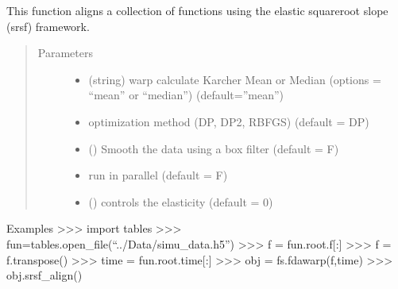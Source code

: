 \documentclass[letterpaper,10pt,english]{sphinxmanual}
\begin{document}
\begin{fulllineitems}
\begin{fulllineitems}
\label{\detokenize{time_warping:time_warping.fdawarp.srsf_align}}
This function aligns a collection of functions using the elastic
square\sphinxhyphen{}root slope (srsf) framework.
\begin{quote}\begin{description}
\item[{Parameters}] \leavevmode\begin{itemize}
\item {} 
 \textendash{} (string) warp calculate Karcher Mean or Median (options = “mean” or “median”) (default=”mean”)

\item {} 
 \textendash{} optimization method (DP, DP2, RBFGS) (default = DP)

\item {} 
 () \textendash{} Smooth the data using a box filter (default = F)

\item {} 
 \textendash{} run in parallel (default = F)

\item {} 
 () \textendash{} controls the elasticity (default = 0)

\end{itemize}

\end{description}\end{quote}

Examples
\textgreater{}\textgreater{}\textgreater{} import tables
\textgreater{}\textgreater{}\textgreater{} fun=tables.open\_file(“../Data/simu\_data.h5”)
\textgreater{}\textgreater{}\textgreater{} f = fun.root.f{[}:{]}
\textgreater{}\textgreater{}\textgreater{} f = f.transpose()
\textgreater{}\textgreater{}\textgreater{} time = fun.root.time{[}:{]}
\textgreater{}\textgreater{}\textgreater{} obj = fs.fdawarp(f,time)
\textgreater{}\textgreater{}\textgreater{} obj.srsf\_align()

\end{fulllineitems}


\end{fulllineitems}
\end{document}
